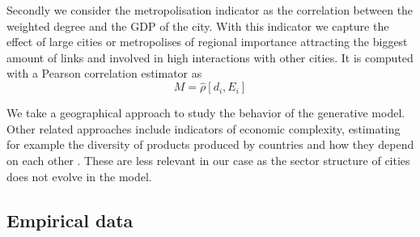 \documentclass[10pt,letterpaper]{article}
\begin{document}
Secondly we consider the metropolisation indicator as the correlation between the weighted degree and the GDP of the city. With this indicator we capture the effect of large cities or metropolises of regional importance attracting the biggest amount of links and involved in high interactions with other cities. It is computed with a Pearson correlation estimator as
\begin{equation}
    M = \hat{\rho} \left[d_i , E_i \right]
\end{equation}


We take a geographical approach to study the behavior of the generative model. Other related approaches include indicators of economic complexity, estimating for example the diversity of products produced by countries and how they depend on each other \cite{hidalgo2007product}. These are less relevant in our case as the sector structure of cities does not evolve in the model.

\subsection*{Empirical data}
\end{document}
